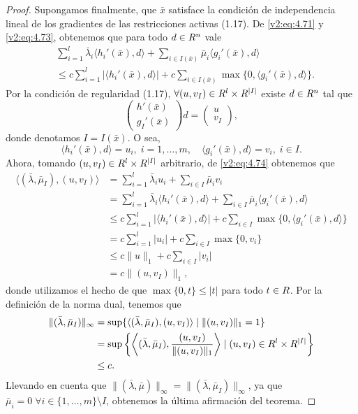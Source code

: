\begin{proof}
    Supongamos finalmente, que $\bar{x}$ satisface la condición de independencia lineal de los gradientes de las restricciones activas (1.17). De \eqref{v2:eq:4.71} y \eqref{v2:eq:4.73}, obtenemos que para todo $d \in R^n$ vale
    \begin{align}
        &\sum_{i=1}^l \bar{\lambda}_i \langle h_i'(\bar{x}), d \rangle + \sum_{i \in I(\bar{x})} \bar{\mu}_i \langle g_i'(\bar{x}), d \rangle \nonumber \\
        &\le c \sum_{i=1}^l |\langle h_i'(\bar{x}), d \rangle| + c \sum_{i \in I(\bar{x})} \max\{0, \langle g_i'(\bar{x}), d \rangle\}.
        \label{v2:eq:4.74}
    \end{align}
    Por la condición de regularidad (1.17), $\forall (u, v_I) \in R^l \times R^{|I|}$ existe $d \in R^n$ tal que
    \[
        \begin{pmatrix} h'(\bar{x}) \\ g_I'(\bar{x}) \end{pmatrix} d = \begin{pmatrix} u \\ v_I \end{pmatrix},
    \]
    donde denotamos $I = I(\bar{x})$. O sea,
    \[
        \langle h_i'(\bar{x}), d \rangle = u_i, \; i = 1, \dots, m, \quad \langle g_i'(\bar{x}), d \rangle = v_i, \; i \in I.
    \]
    Ahora, tomando $(u, v_I) \in R^l \times R^{|I|}$ arbitrario, de \eqref{v2:eq:4.74} obtenemos que
    \begin{align*}
        \langle (\bar{\lambda}, \bar{\mu}_I), (u, v_I) \rangle &= \sum_{i=1}^l \bar{\lambda}_i u_i + \sum_{i \in I} \bar{\mu}_i v_i \\
        &= \sum_{i=1}^l \bar{\lambda}_i \langle h_i'(\bar{x}), d \rangle + \sum_{i \in I} \bar{\mu}_i \langle g_i'(\bar{x}), d \rangle \\
        &\le c \sum_{i=1}^l |\langle h_i'(\bar{x}), d \rangle| + c \sum_{i \in I} \max\{0, \langle g_i'(\bar{x}), d \rangle\} \\
        &= c \sum_{i=1}^l |u_i| + c \sum_{i \in I} \max\{0, v_i\} \\
        &\le c \|u\|_1 + c \sum_{i \in I} |v_i| \\
        &= c \|(u, v_I)\|_1,
    \end{align*}
    donde utilizamos el hecho de que $\max\{0, t\} \le |t|$ para todo $t \in R$. Por la definición de la norma dual, tenemos que
    \begin{align*}
        \|(\bar{\lambda}, \bar{\mu}_I)\|_\infty &= \sup \{ \langle (\bar{\lambda}, \bar{\mu}_I), (u, v_I) \rangle \mid \|(u, v_I)\|_1 = 1 \} \\
        &= \sup \left\{ \left\langle (\bar{\lambda}, \bar{\mu}_I), \frac{(u, v_I)}{\|(u, v_I)\|_1} \right\rangle \mid (u, v_I) \in R^l \times R^{|I|} \right\} \\
        &\le c.
    \end{align*}
    Llevando en cuenta que $\|(\bar{\lambda}, \bar{\mu})\|_\infty = \|(\bar{\lambda}, \bar{\mu}_I)\|_\infty$, ya que $\bar{\mu}_i = 0 \; \forall i \in \{1, \dots, m\} \setminus I$, obtenemos la última afirmación del teorema.
\end{proof}

